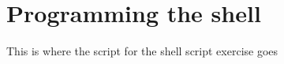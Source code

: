 \chapter{Programming the shell}


\begin{note}
  This is where the script for the shell script exercise goes

\end{note}

